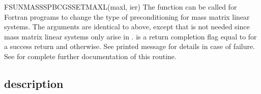 {
  FSUNMASSSPBCGSSETMAXL(maxl, ier)
}
{
  The function  can be called for Fortran
  programs to change the type of preconditioning for mass matrix
  linear systems.
}
{
  The arguments are identical to  above, except that
   is not needed since mass matrix linear systems only arise
  in {\arkode}.
}
{
   is a  return completion flag equal to  for a success
  return and  otherwise. See printed message for details in case
  of failure.
}
{
  See  for complete further documentation of
  this routine.
}


\subsection{{\sunlinsolspbcgs} description}\label{ss:sunlinsol_spbcgs_description}



